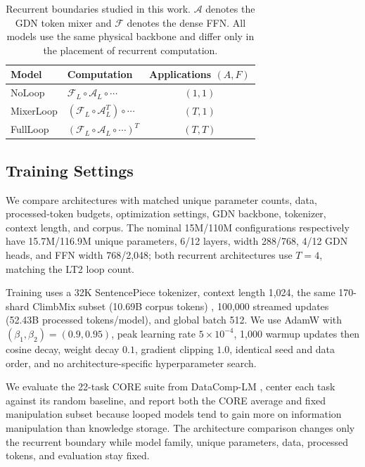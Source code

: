 \documentclass[letterpaper]{article} %
\newcommand{\Aop}{\mathcal{A}}
\newcommand{\Fop}{\mathcal{F}}
\begin{document}
\begin{table}[t]
\centering
\small
\setlength{\tabcolsep}{2pt}
\begin{tabular}{@{}llc@{}}
\toprule
Model & Computation & Applications $(A,F)$ \\
\midrule
NoLoop
&
$\Fop_L\!\circ\!\Aop_L\!\circ\!\cdots$
&
$(1,1)$
\\
MixerLoop
&
$(\Fop_L\!\circ\!\Aop_L^T)\!\circ\!\cdots$
&
$(T,1)$
\\
FullLoop
&
$(\Fop_L\!\circ\!\Aop_L\!\circ\!\cdots)^T$
&
$(T,T)$
\\
\bottomrule
\end{tabular}
\caption{Recurrent boundaries studied in this work. $\Aop$ denotes the GDN
token mixer and $\Fop$ denotes the dense FFN. All models use the same physical
backbone and differ only in the placement of recurrent computation.}
\label{tab:architecture}
\end{table}

\subsection{Training Settings}

We compare architectures with matched unique parameter counts, data,
processed-token budgets, optimization settings, GDN backbone, tokenizer, context length,
and corpus. The nominal 15M/110M configurations respectively have
15.7M/116.9M unique parameters, 6/12 layers, width 288/768, 4/12 GDN heads, and
FFN width 768/2,048; both recurrent architectures use $T=4$, matching the LT2
loop count.

Training uses a 32K SentencePiece tokenizer, context length 1,024, the same
170-shard ClimbMix subset (10.69B corpus tokens) \cite{diao2026nemotronclimb},
100,000 streamed updates (52.43B processed tokens/model), and global batch
512. We use AdamW with $(\beta_1,\beta_2)=(0.9,0.95)$, peak learning rate
$5\times10^{-4}$, 1,000 warmup updates then cosine decay, weight decay $0.1$,
gradient clipping $1.0$, identical seed and data order, and no
architecture-specific hyperparameter search.

We evaluate the 22-task CORE suite from DataComp-LM
\cite{li2025datacomplmsearchgenerationtraining}, center each task against its
random baseline, and report both the CORE average and fixed manipulation subset
because looped models tend to gain more on information manipulation than
knowledge storage. The architecture comparison changes only the recurrent
boundary while model family, unique parameters, data, processed tokens, and
evaluation stay fixed.
\end{document}

